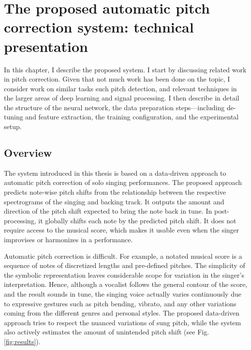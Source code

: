 \chapter{The proposed automatic pitch correction system: technical presentation}
\label{chap:thesis-autotuner}
In this chapter, I describe the proposed system\cite{wager2020deep}. I start by discussing related work in pitch correction. Given that not much work has been done on the topic, I consider work on similar tasks such pitch detection, and relevant techniques in the larger areas of deep learning and signal processing. I then describe in detail the structure of the neural network, the data preparation steps---including de-tuning and feature extraction, the training configuration, and the experimental setup. 


\section{Overview}
The system introduced in this thesis is based on a data-driven approach to automatic pitch correction of solo singing performances. The proposed approach predicts note-wise pitch shifts from the relationship between the respective spectrograms of the singing and backing track. It outputs the amount and direction of the pitch shift expected to bring the note back in tune. In post-processing, it globally shifts each note by the predicted pitch shift. It does not require access to the musical score, which makes it usable even when the singer improvises or harmonizes in a performance.

Automatic pitch correction is difficult. For example, a notated musical score is a sequence of notes of discretized lengths and pre-defined pitches. The simplicity of the symbolic representation leaves considerable scope for variation in the singer's interpretation. Hence, although a vocalist follows the general contour of the score, and the result sounds in tune, the singing voice actually varies continuously due to expressive gestures such as pitch bending, vibrato, and any other variations coming from the different genres and personal styles. The proposed data-driven approach tries to respect the nuanced variations of sung pitch, while the system also actively estimates the amount of unintended pitch shift (see Fig. \ref{fig:results}).

